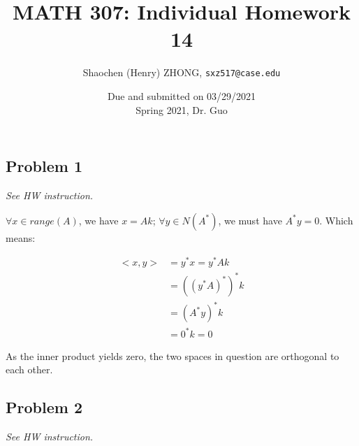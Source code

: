 \documentclass[11pt]{article}
\newcommand{\ilc}{\texttt}
\begin{document}
\title{\textbf{MATH 307: Individual Homework 14}}


\author{Shaochen (Henry) ZHONG, \ilc{sxz517@case.edu}}

\date{Due and submitted on 03/29/2021 \\ Spring 2021, Dr. Guo}
\maketitle



\subsection*{Problem 1}
\textit{See HW instruction.}\newline

%
%

$\forall x \in range(A)$, we have $x = Ak$; $\forall y \in N(A^*)$, we must have $A^* y = 0$. Which means:

\begin{align*}
    <x, y> &= y^* x = y^* Ak \\
    &= ((y^* A)^*)^* k \\
    &= (A^* y)^* k \\
    &= 0^* k = 0
\end{align*}

As the inner product yields zero, the two spaces in question are orthogonal to each other.

\subsection*{Problem 2}
\textit{See HW instruction.}\newline
\end{document}
